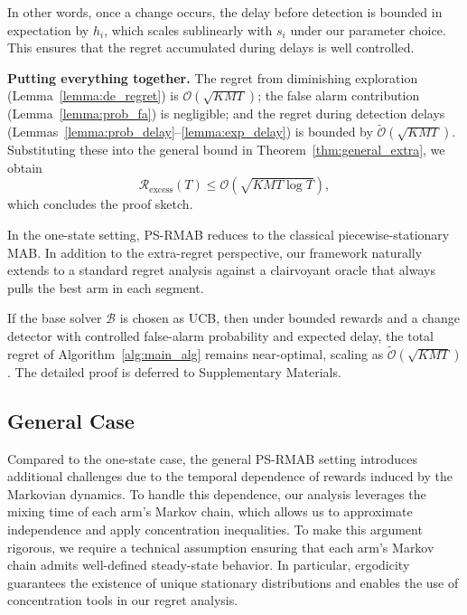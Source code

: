 \documentclass[twoside]{article}
\theoremstyle{plain}
\theoremstyle{definition}
\theoremstyle{remark}
\def\Rex{\mathcal{R}_{\mathrm{excess}}}
\begin{document}
In other words, once a change occurs, the delay before detection is bounded in expectation by $h_i$, which scales sublinearly with $s_i$ under our parameter choice. This ensures that the regret accumulated during delays is well controlled.

\textbf{Putting everything together.}
The regret from diminishing exploration (Lemma~\ref{lemma:de_regret}) is $\mathcal{O}(\sqrt{KMT})$; the false alarm contribution (Lemma~\ref{lemma:prob_fa}) is negligible; and the regret during detection delays (Lemmas~\ref{lemma:prob_delay}–\ref{lemma:exp_delay}) is bounded by $\tilde{\mathcal{O}}(\sqrt{KMT})$. Substituting these into the general bound in Theorem~\ref{thm:general_extra}, we obtain
\begin{equation}
\Rex(T) \le \mathcal{O}\!\left(\sqrt{KMT\log T}\right),
\end{equation}
which concludes the proof sketch.

In the one-state setting, PS-RMAB reduces to the classical piecewise-stationary MAB. 
In addition to the extra-regret perspective, our framework naturally extends to a 
standard regret analysis against a clairvoyant oracle that always pulls the best arm 
in each segment. 

If the base solver $\mathcal{B}$ is chosen as UCB, then under bounded rewards and a 
change detector with controlled false-alarm probability and expected delay, the total 
regret of Algorithm~\ref{alg:main_alg} remains near-optimal, scaling as 
$\tilde{\mathcal{O}}(\sqrt{KMT})$. 
The detailed proof is deferred to Supplementary Materials.
\vspace{-5pt}
\subsection{General Case}
\vspace{-5pt}
Compared to the one-state case, the general PS-RMAB setting introduces additional challenges 
due to the temporal dependence of rewards induced by the Markovian dynamics. 
To handle this dependence, our analysis leverages the mixing time of each arm’s Markov chain, 
which allows us to approximate independence and apply concentration inequalities. 
To make this argument rigorous, we require a technical assumption ensuring that each arm’s 
Markov chain admits well-defined steady-state behavior. 
In particular, ergodicity guarantees the existence of unique stationary distributions and 
enables the use of concentration tools in our regret analysis.
\end{document}
